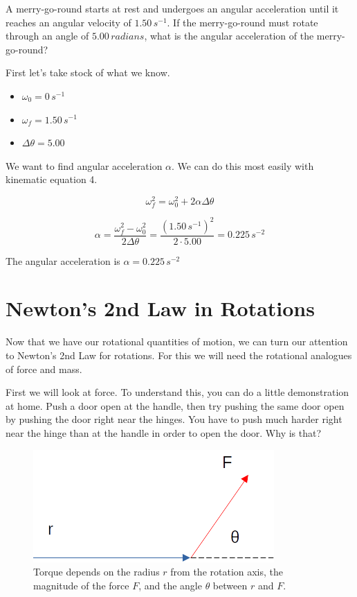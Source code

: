 \documentclass[12pt]{book}
\begin{document}
\begin{exampleblock}

A merry-go-round starts at rest and undergoes an angular acceleration until it reaches an angular velocity of $1.50 \, s^{-1}$. If the merry-go-round must rotate through an angle of $5.00 \, radians$, what is the angular acceleration of the merry-go-round?

\hspace{10pt}

First let's take stock of what we know.

\begin{itemize}
\item $\omega_0 = 0 \, s^{-1}$
\item $\omega_f = 1.50 \, s^{-1}$
\item $\Delta \theta = 5.00$
\end{itemize}

We want to find angular acceleration $\alpha$. We can do this most easily with kinematic equation 4.

\begin{equation}
\omega_f^2 = \omega_0^2 + 2 \alpha \Delta \theta
\end{equation}

\begin{equation}
\alpha = \frac{\omega_f^2 - \omega_0^2}{2 \Delta \theta} = \frac{(1.50 \, s^{-1})^2}{2 \cdot 5.00} = 0.225 \, s^{-2}
\end{equation}

The angular acceleration is $\alpha = 0.225 \, s^{-2}$

\end{exampleblock}

\section{Newton's 2nd Law in Rotations}

Now that we have our rotational quantities of motion, we can turn our attention to Newton's 2nd Law for rotations. For this we will need the rotational analogues of force and mass. 

First we will look at force. To understand this, you can do a little demonstration at home. Push a door open at the handle, then try pushing the same door open by pushing the door right near the hinges. You have to push much harder right near the hinge than at the handle in order to open the door. Why is that?

\begin{figure}[b]
\centering
\includegraphics[scale=0.6]{torque_def.png}
\caption{Torque depends on the radius $r$ from the rotation axis, the magnitude of the force $F$, and the angle $\theta$ between $r$ and $F$.}
\label{torquedef}
\end{figure}
\end{document}
